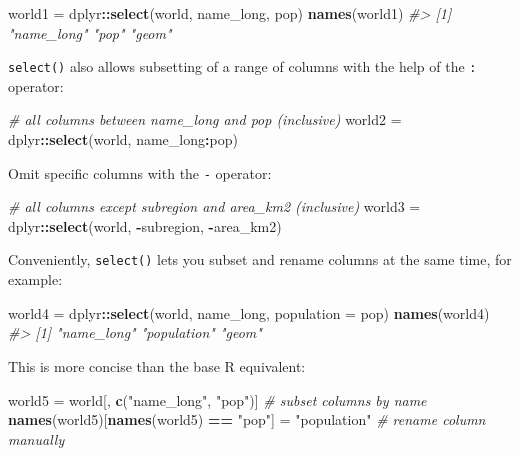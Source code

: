 \documentclass[]{krantz}
\newenvironment{Shaded}{\begin{snugshade}}{\end{snugshade}}
\newcommand{\CommentTok}[1]{\textcolor[rgb]{0.37,0.37,0.37}{\textit{#1}}}
\newcommand{\DataTypeTok}[1]{\textcolor[rgb]{0.27,0.27,0.27}{#1}}
\newcommand{\KeywordTok}[1]{\textcolor[rgb]{0.27,0.27,0.27}{\textbf{#1}}}
\newcommand{\NormalTok}[1]{#1}
\newcommand{\OperatorTok}[1]{\textcolor[rgb]{0.43,0.43,0.43}{\textbf{#1}}}
\newcommand{\StringTok}[1]{\textcolor[rgb]{0.5,0.5,0.5}{#1}}
\begin{document}
\begin{Shaded}
\begin{Highlighting}[]
\NormalTok{world1 =}\StringTok{ }\NormalTok{dplyr}\OperatorTok{::}\KeywordTok{select}\NormalTok{(world, name_long, pop)}
\KeywordTok{names}\NormalTok{(world1)}
\CommentTok{#> [1] "name_long" "pop"       "geom"}
\end{Highlighting}
\end{Shaded}

\texttt{select()} also allows subsetting of a range of columns with the help of the \texttt{:} operator:

\begin{Shaded}
\begin{Highlighting}[]
\CommentTok{# all columns between name_long and pop (inclusive)}
\NormalTok{world2 =}\StringTok{ }\NormalTok{dplyr}\OperatorTok{::}\KeywordTok{select}\NormalTok{(world, name_long}\OperatorTok{:}\NormalTok{pop)}
\end{Highlighting}
\end{Shaded}

Omit specific columns with the \texttt{-} operator:

\begin{Shaded}
\begin{Highlighting}[]
\CommentTok{# all columns except subregion and area_km2 (inclusive)}
\NormalTok{world3 =}\StringTok{ }\NormalTok{dplyr}\OperatorTok{::}\KeywordTok{select}\NormalTok{(world, }\OperatorTok{-}\NormalTok{subregion, }\OperatorTok{-}\NormalTok{area_km2)}
\end{Highlighting}
\end{Shaded}

Conveniently, \texttt{select()} lets you subset and rename columns at the same time, for example:

\begin{Shaded}
\begin{Highlighting}[]
\NormalTok{world4 =}\StringTok{ }\NormalTok{dplyr}\OperatorTok{::}\KeywordTok{select}\NormalTok{(world, name_long, }\DataTypeTok{population =}\NormalTok{ pop)}
\KeywordTok{names}\NormalTok{(world4)}
\CommentTok{#> [1] "name_long"  "population" "geom"}
\end{Highlighting}
\end{Shaded}

This is more concise than the base R equivalent:

\begin{Shaded}
\begin{Highlighting}[]
\NormalTok{world5 =}\StringTok{ }\NormalTok{world[, }\KeywordTok{c}\NormalTok{(}\StringTok{"name_long"}\NormalTok{, }\StringTok{"pop"}\NormalTok{)] }\CommentTok{# subset columns by name}
\KeywordTok{names}\NormalTok{(world5)[}\KeywordTok{names}\NormalTok{(world5) }\OperatorTok{==}\StringTok{ "pop"}\NormalTok{] =}\StringTok{ "population"} \CommentTok{# rename column manually}
\end{Highlighting}
\end{Shaded}
\end{document}
